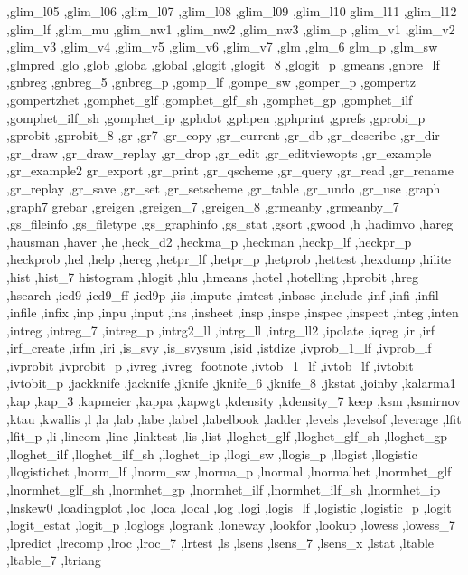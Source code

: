 {{    ,glim_l05 ,glim_l06 ,glim_l07 ,glim_l08 ,glim_l09 ,glim_l10 glim_l11
    ,glim_l12 ,glim_lf ,glim_mu ,glim_nw1 ,glim_nw2 ,glim_nw3 ,glim_p
    ,glim_v1 ,glim_v2 ,glim_v3 ,glim_v4 ,glim_v5 ,glim_v6 ,glim_v7 ,glm
    ,glm_6 glm_p ,glm_sw ,glmpred ,glo ,glob ,globa ,global ,glogit
    ,glogit_8 ,glogit_p ,gmeans ,gnbre_lf ,gnbreg ,gnbreg_5 ,gnbreg_p
    ,gomp_lf ,gompe_sw ,gomper_p ,gompertz ,gompertzhet ,gomphet_glf
    ,gomphet_glf_sh ,gomphet_gp ,gomphet_ilf ,gomphet_ilf_sh ,gomphet_ip
    ,gphdot ,gphpen ,gphprint ,gprefs ,gprobi_p ,gprobit ,gprobit_8
    ,gr ,gr7 ,gr_copy ,gr_current ,gr_db ,gr_describe ,gr_dir ,gr_draw
    ,gr_draw_replay ,gr_drop ,gr_edit ,gr_editviewopts ,gr_example
    ,gr_example2 gr_export ,gr_print ,gr_qscheme ,gr_query ,gr_read
    ,gr_rename ,gr_replay ,gr_save ,gr_set ,gr_setscheme ,gr_table
    ,gr_undo ,gr_use ,graph ,graph7 grebar ,greigen ,greigen_7
    ,greigen_8 ,grmeanby ,grmeanby_7 ,gs_fileinfo ,gs_filetype
    ,gs_graphinfo ,gs_stat ,gsort ,gwood ,h ,hadimvo ,hareg ,hausman
    ,haver ,he ,heck_d2 ,heckma_p ,heckman ,heckp_lf ,heckpr_p ,heckprob
    ,hel ,help ,hereg ,hetpr_lf ,hetpr_p ,hetprob ,hettest ,hexdump
    ,hilite ,hist ,hist_7 histogram ,hlogit ,hlu ,hmeans ,hotel
    ,hotelling ,hprobit ,hreg ,hsearch ,icd9 ,icd9_ff ,icd9p ,iis
    ,impute ,imtest ,inbase ,include ,inf ,infi ,infil ,infile ,infix
    ,inp ,inpu ,input ,ins ,insheet ,insp ,inspe ,inspec ,inspect ,integ
    ,inten ,intreg ,intreg_7 ,intreg_p ,intrg2_ll ,intrg_ll ,intrg_ll2
    ,ipolate ,iqreg ,ir ,irf ,irf_create ,irfm ,iri ,is_svy ,is_svysum
    ,isid ,istdize ,ivprob_1_lf ,ivprob_lf ,ivprobit ,ivprobit_p ,ivreg
    ,ivreg_footnote ,ivtob_1_lf ,ivtob_lf ,ivtobit ,ivtobit_p ,jackknife
    ,jacknife ,jknife ,jknife_6 ,jknife_8 ,jkstat ,joinby ,kalarma1
    ,kap ,kap_3 ,kapmeier ,kappa ,kapwgt ,kdensity ,kdensity_7 keep
    ,ksm ,ksmirnov ,ktau ,kwallis ,l ,la ,lab ,labe ,label ,labelbook
    ,ladder ,levels ,levelsof ,leverage ,lfit ,lfit_p ,li ,lincom ,line
    ,linktest ,lis ,list ,lloghet_glf ,lloghet_glf_sh ,lloghet_gp
    ,lloghet_ilf ,lloghet_ilf_sh ,lloghet_ip ,llogi_sw ,llogis_p
    ,llogist ,llogistic ,llogistichet ,lnorm_lf ,lnorm_sw ,lnorma_p
    ,lnormal ,lnormalhet ,lnormhet_glf ,lnormhet_glf_sh ,lnormhet_gp
    ,lnormhet_ilf ,lnormhet_ilf_sh ,lnormhet_ip ,lnskew0 ,loadingplot
    ,loc ,loca ,local ,log ,logi ,logis_lf ,logistic ,logistic_p
    ,logit ,logit_estat ,logit_p ,loglogs ,logrank ,loneway ,lookfor
    ,lookup ,lowess ,lowess_7 ,lpredict ,lrecomp ,lroc ,lroc_7 ,lrtest
    ,ls ,lsens ,lsens_7 ,lsens_x ,lstat ,ltable ,ltable_7 ,ltriang
}}
